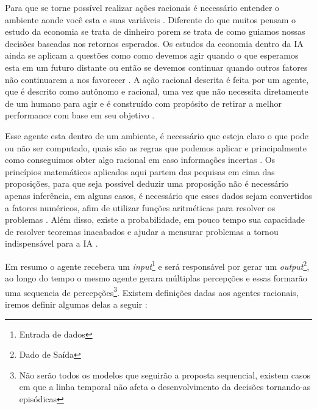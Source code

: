 Para que se torne possível realizar ações racionais é necessário entender o ambiente aonde você esta e suas variáveis \cite[99]{simon1955behavioral}. Diferente do que muitos pensam o estudo da economia se trata de dinheiro porem se trata de como guiamos nossas decisões baseadas nos retornos esperados. Os estudos da economia dentro da IA ainda se aplicam a questões como como devemos agir quando o que esperamos esta em um futuro distante ou então se devemos continuar quando outros fatores não continuarem a nos favorecer \cite[9]{russell2003artificial}. A ação racional descrita é feita por um agente, que é descrito como autônomo e racional, uma vez que não necessita diretamente de um humano para agir e é construído com propósito de retirar a melhor performance com base em seu objetivo \cite[2]{ wooldridge1994agent}.

Esse agente esta dentro de um ambiente, é necessário que esteja claro o que pode ou não ser computado, quais são as regras que podemos aplicar e principalmente como conseguimos obter algo racional em caso informações incertas \cite[7]{russell2003artificial}. Os princípios matemáticos aplicados aqui partem das pequisas em cima das proposições, para que seja possível deduzir uma proposição não é necessário apenas inferência, em alguns casos, é necessário que esses dados sejam convertidos a fatores numéricos, afim de utilizar funções aritméticas para resolver os problemas \cite[2-4]{boole1854investigation}. Além disso, existe a probabilidade, em pouco tempo sua capacidade de resolver teoremas inacabados e ajudar a mensurar problemas a tornou indispensável para a IA \cite[9]{russell2003artificial}.
 
Em resumo o agente recebera um \textit{input}\footnote{Entrada de dados} e será responsável por gerar um \textit{output}\footnote{Dado de Saída}, ao longo do tempo o mesmo agente gerara múltiplas percepções e essas formarão uma sequencia de percepções\footnote{Não serão todos os modelos que seguirão a proposta sequencial, existem casos em que a linha temporal não afeta o desenvolvimento da decisões tornando-as episódicas}. \cite[34-35]{russell2003artificial} Existem definições dadas aos agentes racionais, iremos definir algumas delas a seguir \cite[42-45]{russell2003artificial}:

